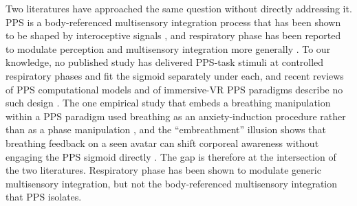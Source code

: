 Two literatures have approached the same question without directly addressing it. PPS is a body-referenced multisensory integration process that has been shown to be shaped by interoceptive signals \citep{Ardizzi2018, salvato_2020, bogdanova_2021}, and respiratory phase has been reported to modulate perception and multisensory integration more generally \citep{saltafossi_2025, kluger_2021, grund_2021}. To our knowledge, no published study has delivered PPS-task stimuli at controlled respiratory phases and fit the sigmoid separately under each, and recent reviews of PPS computational models and of immersive-VR PPS paradigms describe no such design \citep{bertoni_2025, karakoc_2025}. The one empirical study that embeds a breathing manipulation within a PPS paradigm used breathing as an anxiety-induction procedure rather than as a phase manipulation \citep{spaccasassi_2019}, and the ``embreathment'' illusion shows that breathing feedback on a seen avatar can shift corporeal awareness without engaging the PPS sigmoid directly \citep{monti2020embreathment, Allard2017, Betka2020, Betka2022}. The gap is therefore at the intersection of the two literatures. Respiratory phase has been shown to modulate generic multisensory integration, but not the body-referenced multisensory integration that PPS isolates.

